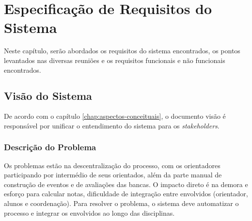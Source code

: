 \chapter{Especificação de Requisitos do Sistema}\label{chap:especificacao-requisitos-sistema}
Neste capítulo, serão abordados os requisitos do sistema encontrados, os pontos levantados nas diversas reuniões e os requisitos funcionais e não funcionais encontrados.

\section{Visão do Sistema}
De acordo com o capítulo \ref{chap:aspectos-conceituais}, o documento visão é responsável por unificar o entendimento do sistema para os \textit{stakeholders}.

\subsection{Descrição do Problema}
Os problemas estão na descentralização do processo, com os orientadores participando por intermédio de seus orientados, além da parte manual de construção de eventos e de avaliações das bancas. O impacto direto é na demora e esforço para calcular notas, dificuldade de integração entre envolvidos (orientador, alunos e coordenação). Para resolver o problema, o sistema deve automatizar o processo e integrar os envolvidos ao longo das disciplinas.

\begin{table}[!htb]
    \centering
    \caption{Sentença básica de posição do produto}
    \label{sentenca-posicao}
\end{table}


